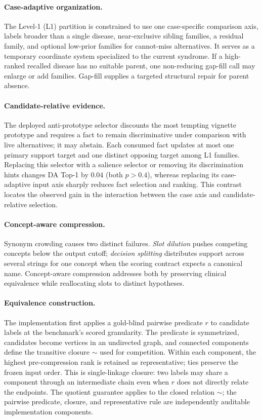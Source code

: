 \documentclass[letterpaper]{article}
\begin{document}
\paragraph{Case-adaptive organization.}
The Level-1 (L1) partition is constrained to use one case-specific comparison axis, labels broader than a single disease, near-exclusive sibling families, a residual family, and optional low-prior families for cannot-miss alternatives.
It serves as a temporary coordinate system specialized to the current syndrome.
If a high-ranked recalled disease has no suitable parent, one non-reducing gap-fill call may enlarge or add families.
Gap-fill supplies a targeted structural repair for parent absence.

\paragraph{Candidate-relative evidence.}
The deployed anti-prototype selector discounts the most tempting vignette prototype and requires a fact to remain discriminative under comparison with live alternatives; it may abstain.
Each consumed fact updates at most one primary support target and one distinct opposing target among L1 families.
Replacing this selector with a salience selector or removing its discrimination hints changes DA Top-1 by $0.04$ (both $p>0.4$), whereas replacing its case-adaptive input axis sharply reduces fact selection and ranking.
This contrast locates the observed gain in the interaction between the case axis and candidate-relative selection.

\paragraph{Concept-aware compression.}
Synonym crowding causes two distinct failures.
\emph{Slot dilution} pushes competing concepts below the output cutoff; \emph{decision splitting} distributes support across several strings for one concept when the scoring contract expects a canonical name.
Concept-aware compression addresses both by preserving clinical equivalence while reallocating slots to distinct hypotheses.

\paragraph{Equivalence construction.}
The implementation first applies a gold-blind pairwise predicate $r$ to candidate labels at the benchmark's scored granularity.
The predicate is symmetrized, candidates become vertices in an undirected graph, and connected components define the transitive closure $\sim$ used for competition.
Within each component, the highest pre-compression rank is retained as representative; ties preserve the frozen input order.
This is single-linkage closure: two labels may share a component through an intermediate chain even when $r$ does not directly relate the endpoints.
The quotient guarantee applies to the closed relation $\sim$; the pairwise predicate, closure, and representative rule are independently auditable implementation components.
\end{document}
